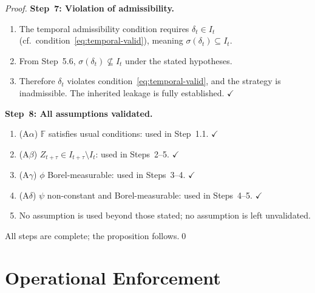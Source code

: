 \documentclass[12pt,openany]{book}
\newcommand{\calI}{\mathcal{I}}
\numberwithin{equation}{chapter}
\theoremstyle{plain}
\theoremstyle{definition}
\theoremstyle{remark}
\numberwithin{equation}{chapter}
\theoremstyle{plain}
\def\calI{I}%
\begin{document}
\begin{proof}
\medskip
\noindent\textbf{Step~7: Violation of admissibility.}
\begin{enumerate}
  \item The temporal admissibility condition
        requires $\delta_t \in \calI_t$
        (cf.\ condition~\eqref{eq:temporal-valid}), meaning
        $\sigma(\delta_t) \subseteq \calI_t$.
  \item From Step~5.6, $\sigma(\delta_t) \not\subseteq \calI_t$
        under the stated hypotheses.
  \item Therefore $\delta_t$ violates
        condition~\eqref{eq:temporal-valid}, and the strategy
        is inadmissible.  The inherited leakage is fully
        established. $\checkmark$
\end{enumerate}

\medskip
\noindent\textbf{Step~8: All assumptions validated.}
\begin{enumerate}
  \item (A$\alpha$) $\mathbb{F}$ satisfies usual conditions:
        used in Step~1.1. $\checkmark$
  \item (A$\beta$) $Z_{t+\tau} \in \calI_{t+\tau}\setminus\calI_t$:
        used in Steps~2--5. $\checkmark$
  \item (A$\gamma$) $\phi$ Borel-measurable:
        used in Steps~3--4. $\checkmark$
  \item (A$\delta$) $\psi$ non-constant and Borel-measurable:
        used in Steps~4--5. $\checkmark$
  \item No assumption is used beyond those stated; no
        assumption is left unvalidated.
\end{enumerate}

All steps are complete; the proposition follows.\qed
\end{proof}

\section{Operational Enforcement}
\end{document}
